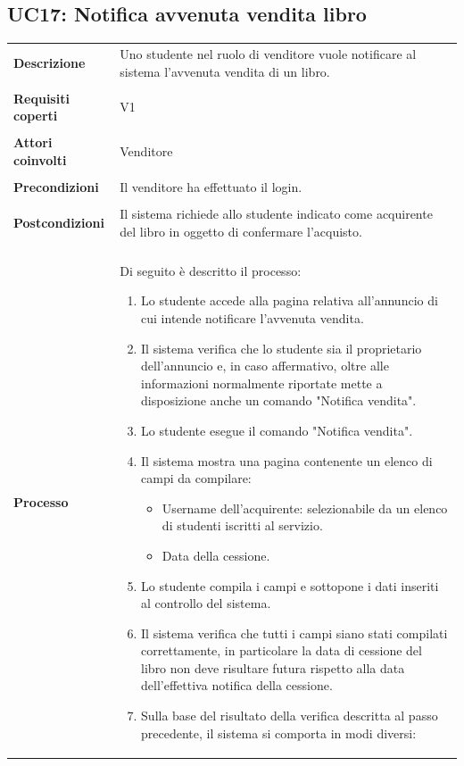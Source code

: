 \documentclass[10pt,a4paper]{article}
\begin{document}
	\subsection{UC17: Notifica avvenuta vendita libro}
	\begin{tabular}{lp{}}
		\textbf{Descrizione}&Uno studente nel ruolo di venditore vuole notificare al sistema l'avvenuta vendita di un libro.\\
		\\
		\textbf{Requisiti coperti}&V1\\
		\\
		\textbf{Attori coinvolti}&Venditore\\
		\\
		\textbf{Precondizioni}&Il venditore ha effettuato il login.\\
		\\
		\textbf{Postcondizioni}&Il sistema richiede allo studente indicato come acquirente del libro in oggetto di confermare l'acquisto.\\
		\\
		\textbf{Processo}&Di seguito è descritto il processo:
		\begin{enumerate}
			\item Lo studente accede alla pagina relativa all'annuncio di cui intende notificare l'avvenuta vendita.
			\item Il sistema verifica che lo studente sia il proprietario dell'annuncio e, in caso affermativo, oltre alle informazioni normalmente riportate mette a disposizione anche un comando "Notifica vendita".
			\item Lo studente esegue il comando "Notifica vendita".
			\item Il sistema mostra una pagina contenente un elenco di campi da compilare:
			\begin{itemize}
				\item Username dell'acquirente: selezionabile da un elenco di studenti iscritti al servizio.
				\item Data della cessione.
			\end{itemize}
			\item Lo studente compila i campi e sottopone i dati inseriti al controllo del sistema.
			\item Il sistema verifica che tutti i campi siano stati compilati correttamente, in particolare la data di cessione del libro non deve risultare futura rispetto alla data dell'effettiva notifica della cessione.
			\item Sulla base del risultato della verifica descritta al passo precedente, il sistema si comporta in modi diversi:

\end{enumerate}
\end{tabular}
\end{document}
